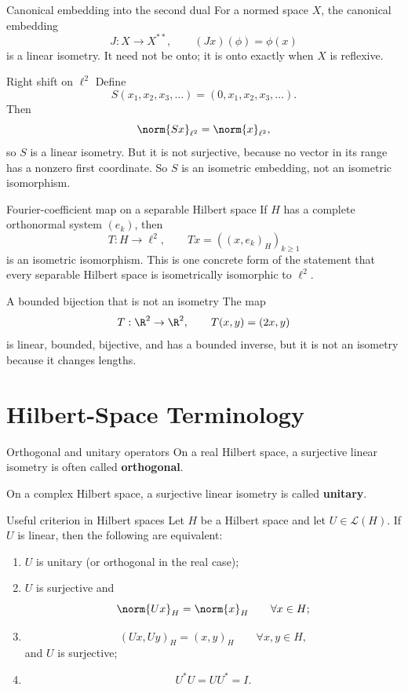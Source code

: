\documentclass[11pt]{article}
\begin{document}
\begin{exbox}{Canonical embedding into the second dual}
For a normed space $X$, the canonical embedding
\[
J:X\to X^{**},
\qquad
(Jx)(\phi)=\phi(x)
\]
is a linear isometry. It need not be onto; it is onto exactly when $X$ is reflexive.
\end{exbox}

\begin{exbox}{Right shift on $\ell^2$}
Define
\[
S(x_1,x_2,x_3,\dots)=(0,x_1,x_2,x_3,\dots).
\]
Then
\[
\norm{Sx}_{\ell^2}=\norm{x}_{\ell^2},
\]
so $S$ is a linear isometry. But it is not surjective, because no vector in its range has a nonzero first coordinate. So $S$ is an isometric embedding, not an isometric isomorphism.
\end{exbox}

\begin{exbox}{Fourier-coefficient map on a separable Hilbert space}
If $H$ has a complete orthonormal system $(e_k)$, then
\[
T:H\to \ell^2,
\qquad
Tx=((x,e_k)_H)_{k\ge 1}
\]
is an isometric isomorphism. This is one concrete form of the statement that every separable Hilbert space is isometrically isomorphic to $\ell^2$.
\end{exbox}

\begin{exbox}{A bounded bijection that is not an isometry}
The map
\[
T:\R^2\to\R^2,
\qquad
T(x,y)=(2x,y)
\]
is linear, bounded, bijective, and has a bounded inverse, but it is not an isometry because it changes lengths.
\end{exbox}

\section{Hilbert-Space Terminology}

\begin{defbox}{Orthogonal and unitary operators}
On a real Hilbert space, a surjective linear isometry is often called \textbf{orthogonal}.

On a complex Hilbert space, a surjective linear isometry is called \textbf{unitary}.
\end{defbox}

\begin{thmbox}{Useful criterion in Hilbert spaces}
Let $H$ be a Hilbert space and let $U\in\mathcal L(H)$. If $U$ is linear, then the following are equivalent:
\begin{enumerate}
\item $U$ is unitary (or orthogonal in the real case);
\item $U$ is surjective and
\[
\norm{Ux}_H=\norm{x}_H \qquad \forall x\in H;
\]
\item
\[
(Ux,Uy)_H=(x,y)_H \qquad \forall x,y\in H,
\]
and $U$ is surjective;
\item
\[
U^*U=UU^*=I.
\]
\end{enumerate}
\end{thmbox}
\end{document}
